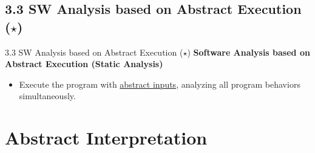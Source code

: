 \documentclass[10pt]{beamer}
\begin{document}
	\subsection{3.3 SW Analysis based on Abstract Execution ($\star$)}
	\begin{frame}{3.3 SW Analysis based on Abstract Execution ($\star$)}
		\textbf{Software Analysis based on Abstract Execution (Static Analysis)}
		\begin{itemize}
			\item Execute the program with \underline{abstract inputs}, analyzing all program behaviors simultaneously.
		\end{itemize}
	\end{frame}
	
	\section{Abstract Interpretation}
\end{document}
